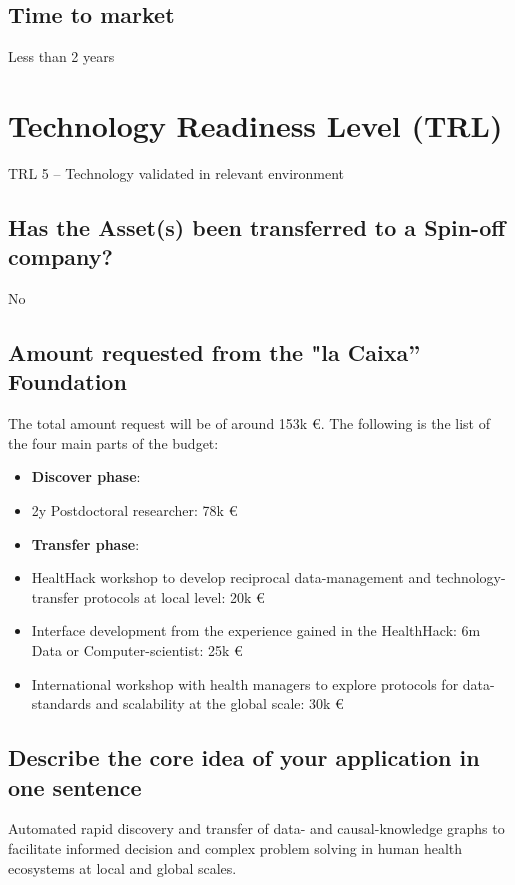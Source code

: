 \documentclass[authoryear,1p,12pt]{elsarticle}
\begin{document}
\subsection{{\bf Time to market}}
Less than 2 years

\section{{\bf Technology Readiness Level (TRL)}}
TRL 5 – Technology validated in relevant environment

\subsection{{\bf Has the Asset(s) been transferred to a Spin-off company?}}
No

\subsection{{\bf Amount requested from the "la Caixa'' Foundation}}

The total amount request will be of around 153k \euro{}. The following
is the list of the four main parts of the budget:
\begin{itemize}
\item {\bf Discover phase}:
  \item 2y Postdoctoral researcher: 78k \euro{}
  \item {\bf Transfer phase}:
  \item HealtHack workshop to develop reciprocal data-management and
    technology-transfer protocols at local level: 20k \euro{}
  \item Interface development from the experience gained in the
    HealthHack: 6m Data or Computer-scientist: 25k \euro{}
  \item International workshop with health managers to explore
    protocols for data-standards and scalability at the global scale:
    30k \euro{}
  \end{itemize}  

\subsection{{\bf Describe the core idea of your application in one sentence}}
Automated rapid discovery and transfer of data- and causal-knowledge
graphs to facilitate informed decision and complex problem solving in
human health ecosystems at local and global scales.
\end{document}
